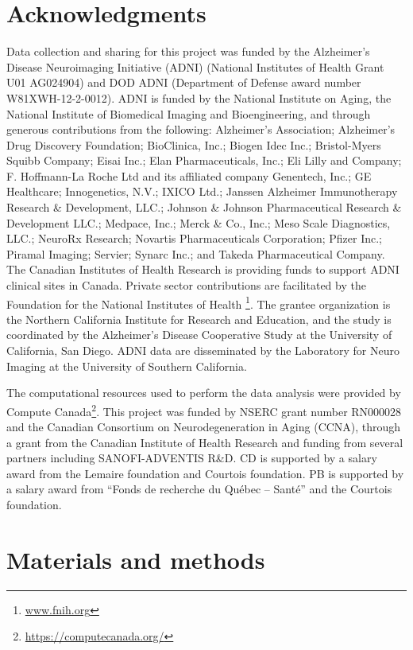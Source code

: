 \documentclass[authoryear]{elsarticle}
\begin{document}
\section{Acknowledgments}

Data collection and sharing for this project was funded by the Alzheimer's Disease Neuroimaging Initiative (ADNI) (National Institutes of Health Grant U01 AG024904) and DOD ADNI (Department of Defense award number W81XWH-12-2-0012). ADNI is funded by the National Institute on Aging, the National Institute of Biomedical Imaging and Bioengineering, and through generous contributions from the following: Alzheimer's Association; Alzheimer's Drug Discovery Foundation; BioClinica, Inc.; Biogen Idec Inc.; Bristol-Myers Squibb Company; Eisai Inc.; Elan Pharmaceuticals, Inc.; Eli Lilly and Company; F. Hoffmann-La Roche Ltd and its affiliated company Genentech, Inc.; GE Healthcare; Innogenetics, N.V.; IXICO Ltd.; Janssen Alzheimer Immunotherapy Research \& Development, LLC.; Johnson \& Johnson Pharmaceutical Research \& Development LLC.; Medpace, Inc.; Merck \& Co., Inc.; Meso Scale Diagnostics, LLC.; NeuroRx Research; Novartis Pharmaceuticals Corporation; Pfizer Inc.; Piramal Imaging; Servier; Synarc Inc.; and Takeda Pharmaceutical Company. The Canadian Institutes of Health Research is providing funds to support ADNI clinical sites in Canada. Private sector contributions are facilitated by the Foundation for the National Institutes of Health \footnote{\url{www.fnih.org}}. The grantee organization is the Northern California Institute for Research and Education, and the study is coordinated by the Alzheimer's Disease Cooperative Study at the University of California, San Diego. ADNI data are disseminated by the Laboratory for Neuro Imaging at the University of Southern California.

The computational resources used to perform the data analysis were provided by Compute Canada\footnote{\url{https://computecanada.org/}}. This project was funded by NSERC grant number RN000028 and the Canadian Consortium on Neurodegeneration in Aging (CCNA), through a grant from the Canadian Institute of Health Research and funding from several partners including SANOFI-ADVENTIS R\&D. CD is supported by a salary award from the Lemaire foundation and Courtois foundation. PB is supported by a salary award from ``Fonds de recherche du Qu\'ebec -- Sant\'e'' and the Courtois foundation.


\section{Materials and methods}
\end{document}
